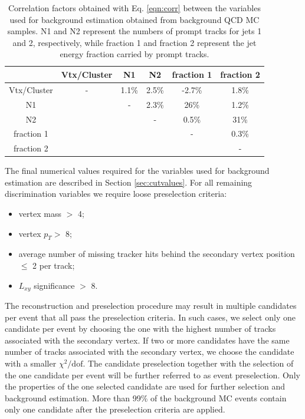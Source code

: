 \begin{table}[htbp]
\centering
\caption{Correlation factors obtained with Eq. \ref{eqn:corr} between the variables 
used for background estimation obtained from background QCD MC
samples. N1 and N2 represent the numbers
of prompt tracks for jets 1 and 2, respectively, while fraction 1 and fraction 2 represent the jet energy fraction carried by
prompt tracks.
\label{tab:corr}}
\vspace{0.1cm}
\begin{tabular}{c|ccccc}
 & Vtx/Cluster & N1 & N2 & fraction 1 & fraction 2 \\
\hline
Vtx/Cluster & - & 1.1\% & 2.5\% & -2.7\% & 1.8\%  \\
N1 & & - & 2.3\% & 26\%  & 1.2\% \\
N2 & & & - & 0.5\% & 31\% \\
fraction 1 & & & & - & 0.3\% \\
fraction 2 & & & & & - \\
\end{tabular}
\end{table}

The final numerical values required for the variables used for background estimation are described in Section 
\ref{sec:cutvalues}. For all remaining discrimination variables we require loose preselection criteria:   
\begin{itemize}
 \item vertex mass $>$ 4\GeV;
 \item vertex $p_T>$ 8\GeV;
 \item average number of missing tracker hits behind the secondary vertex position $\leq$ 2 per track;
 \item $L_{xy}$ significance $>$ 8.
\end{itemize}

The reconstruction and preselection procedure 
may result in multiple candidates per event that all pass
the preselection criteria. In such cases, we select only one candidate per event by
choosing the one with the highest number of tracks associated with the secondary vertex.
If two or more candidates have the same number of tracks associated with the secondary vertex,
we choose the candidate with a smaller $\chi^2/\text{dof}$. The candidate preselection together
with the selection of the 
one candidate per event will be further referred to as event preselection.
Only the 
properties of the one selected candidate are used for further selection and background estimation.
More than 99\% of the background MC events contain only one candidate
after the preselection criteria are applied. 

